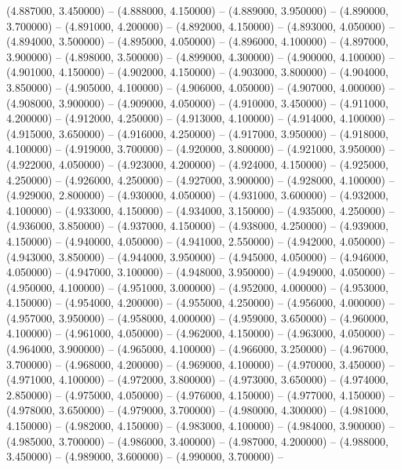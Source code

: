 (4.887000, 3.450000) -- 
(4.888000, 4.150000) -- 
(4.889000, 3.950000) -- 
(4.890000, 3.700000) -- 
(4.891000, 4.200000) -- 
(4.892000, 4.150000) -- 
(4.893000, 4.050000) -- 
(4.894000, 3.500000) -- 
(4.895000, 4.050000) -- 
(4.896000, 4.100000) -- 
(4.897000, 3.900000) -- 
(4.898000, 3.500000) -- 
(4.899000, 4.300000) -- 
(4.900000, 4.100000) -- 
(4.901000, 4.150000) -- 
(4.902000, 4.150000) -- 
(4.903000, 3.800000) -- 
(4.904000, 3.850000) -- 
(4.905000, 4.100000) -- 
(4.906000, 4.050000) -- 
(4.907000, 4.000000) -- 
(4.908000, 3.900000) -- 
(4.909000, 4.050000) -- 
(4.910000, 3.450000) -- 
(4.911000, 4.200000) -- 
(4.912000, 4.250000) -- 
(4.913000, 4.100000) -- 
(4.914000, 4.100000) -- 
(4.915000, 3.650000) -- 
(4.916000, 4.250000) -- 
(4.917000, 3.950000) -- 
(4.918000, 4.100000) -- 
(4.919000, 3.700000) -- 
(4.920000, 3.800000) -- 
(4.921000, 3.950000) -- 
(4.922000, 4.050000) -- 
(4.923000, 4.200000) -- 
(4.924000, 4.150000) -- 
(4.925000, 4.250000) -- 
(4.926000, 4.250000) -- 
(4.927000, 3.900000) -- 
(4.928000, 4.100000) -- 
(4.929000, 2.800000) -- 
(4.930000, 4.050000) -- 
(4.931000, 3.600000) -- 
(4.932000, 4.100000) -- 
(4.933000, 4.150000) -- 
(4.934000, 3.150000) -- 
(4.935000, 4.250000) -- 
(4.936000, 3.850000) -- 
(4.937000, 4.150000) -- 
(4.938000, 4.250000) -- 
(4.939000, 4.150000) -- 
(4.940000, 4.050000) -- 
(4.941000, 2.550000) -- 
(4.942000, 4.050000) -- 
(4.943000, 3.850000) -- 
(4.944000, 3.950000) -- 
(4.945000, 4.050000) -- 
(4.946000, 4.050000) -- 
(4.947000, 3.100000) -- 
(4.948000, 3.950000) -- 
(4.949000, 4.050000) -- 
(4.950000, 4.100000) -- 
(4.951000, 3.000000) -- 
(4.952000, 4.000000) -- 
(4.953000, 4.150000) -- 
(4.954000, 4.200000) -- 
(4.955000, 4.250000) -- 
(4.956000, 4.000000) -- 
(4.957000, 3.950000) -- 
(4.958000, 4.000000) -- 
(4.959000, 3.650000) -- 
(4.960000, 4.100000) -- 
(4.961000, 4.050000) -- 
(4.962000, 4.150000) -- 
(4.963000, 4.050000) -- 
(4.964000, 3.900000) -- 
(4.965000, 4.100000) -- 
(4.966000, 3.250000) -- 
(4.967000, 3.700000) -- 
(4.968000, 4.200000) -- 
(4.969000, 4.100000) -- 
(4.970000, 3.450000) -- 
(4.971000, 4.100000) -- 
(4.972000, 3.800000) -- 
(4.973000, 3.650000) -- 
(4.974000, 2.850000) -- 
(4.975000, 4.050000) -- 
(4.976000, 4.150000) -- 
(4.977000, 4.150000) -- 
(4.978000, 3.650000) -- 
(4.979000, 3.700000) -- 
(4.980000, 4.300000) -- 
(4.981000, 4.150000) -- 
(4.982000, 4.150000) -- 
(4.983000, 4.100000) -- 
(4.984000, 3.900000) -- 
(4.985000, 3.700000) -- 
(4.986000, 3.400000) -- 
(4.987000, 4.200000) -- 
(4.988000, 3.450000) -- 
(4.989000, 3.600000) -- 
(4.990000, 3.700000) -- 
